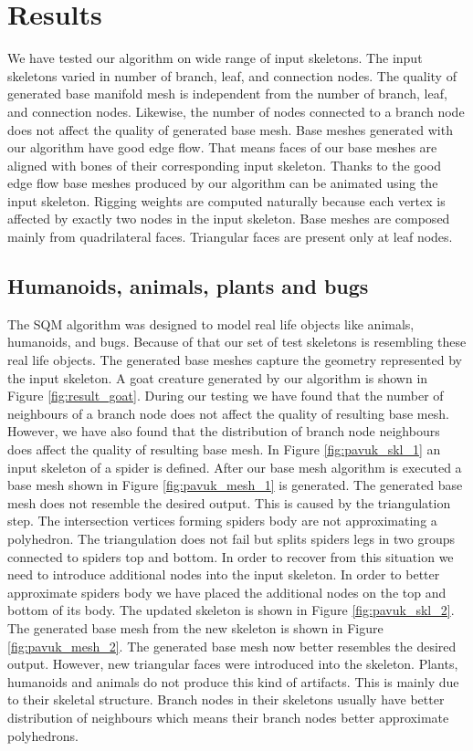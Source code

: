 \chapter{Results}

We have tested our algorithm on wide range of input skeletons.
The input skeletons varied in number of branch, leaf, and connection nodes.
The quality of generated base manifold mesh is independent from the number of branch, leaf, and connection nodes.
Likewise, the number of nodes connected to a branch node does not affect the quality of generated base mesh.
Base meshes generated with our algorithm have good edge flow.
That means faces of our base meshes are aligned with bones of their corresponding input skeleton.
Thanks to the good edge flow base meshes produced by our algorithm can be animated using the input skeleton.
Rigging weights are computed naturally because each vertex is affected by exactly two nodes in the input skeleton.
Base meshes are composed mainly from quadrilateral faces.
Triangular faces are present only at leaf nodes.

\section{Humanoids, animals, plants and bugs}

The SQM algorithm was designed to model real life objects like animals, humanoids, and bugs.
Because of that our set of test skeletons is resembling these real life objects.
The generated base meshes capture the geometry represented by the input skeleton.
A goat creature generated by our algorithm is shown in Figure \ref{fig:result_goat}.
During our testing we have found that the number of neighbours of a branch node does not affect the quality of resulting base mesh.
However, we have also found that the distribution of branch node neighbours does affect the quality of resulting base mesh.
In Figure \ref{fig:pavuk_skl_1} an input skeleton of a spider is defined.
After our base mesh algorithm is executed a base mesh shown in Figure \ref{fig:pavuk_mesh_1} is generated.
The generated base mesh does not resemble the desired output.
This is caused by the triangulation step.
The intersection vertices forming spiders body are not approximating a polyhedron.
The triangulation does not fail but splits spiders legs in two groups connected to spiders top and bottom.
In order to recover from this situation we need to introduce additional nodes into the input skeleton.
In order to better approximate spiders body we have placed the additional nodes on the top and bottom of its body.
The updated skeleton is shown in Figure \ref{fig:pavuk_skl_2}.
The generated base mesh from the new skeleton is shown in Figure \ref{fig:pavuk_mesh_2}.
The generated base mesh now better resembles the desired output.
However, new triangular faces were introduced into the skeleton.
Plants, humanoids and animals do not produce this kind of artifacts.
This is mainly due to their skeletal structure.
Branch nodes in their skeletons usually have better distribution of neighbours which means their branch nodes better approximate polyhedrons.

